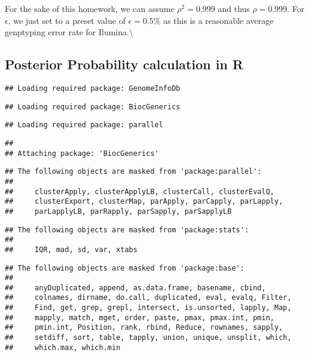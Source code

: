 \documentclass[]{article}
\begin{document}
For the sake of this homework, we can assume \(\rho^2=0.999\) and thus
\(\rho=0.999\). For \(\epsilon\), we just set to a preset value of
\(\epsilon=0.5\%\) as this is a reasonable average genptyping error rate
for Ilumina.\textbackslash{}

\hypertarget{posterior-probability-calculation-in-r}{%
\subsection{Posterior Probability calculation in
R}\label{posterior-probability-calculation-in-r}}

\begin{verbatim}
## Loading required package: GenomeInfoDb
\end{verbatim}

\begin{verbatim}
## Loading required package: BiocGenerics
\end{verbatim}

\begin{verbatim}
## Loading required package: parallel
\end{verbatim}

\begin{verbatim}
## 
## Attaching package: 'BiocGenerics'
\end{verbatim}

\begin{verbatim}
## The following objects are masked from 'package:parallel':
## 
##     clusterApply, clusterApplyLB, clusterCall, clusterEvalQ,
##     clusterExport, clusterMap, parApply, parCapply, parLapply,
##     parLapplyLB, parRapply, parSapply, parSapplyLB
\end{verbatim}

\begin{verbatim}
## The following objects are masked from 'package:stats':
## 
##     IQR, mad, sd, var, xtabs
\end{verbatim}

\begin{verbatim}
## The following objects are masked from 'package:base':
## 
##     anyDuplicated, append, as.data.frame, basename, cbind,
##     colnames, dirname, do.call, duplicated, eval, evalq, Filter,
##     Find, get, grep, grepl, intersect, is.unsorted, lapply, Map,
##     mapply, match, mget, order, paste, pmax, pmax.int, pmin,
##     pmin.int, Position, rank, rbind, Reduce, rownames, sapply,
##     setdiff, sort, table, tapply, union, unique, unsplit, which,
##     which.max, which.min
\end{verbatim}
\end{document}

